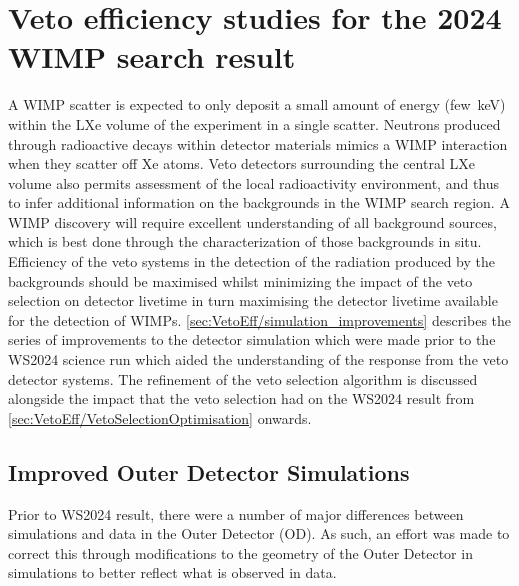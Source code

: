 \chapter{Veto efficiency studies for the 2024 WIMP search result}\label{chap:VetoEfficiency}
A WIMP scatter is expected to only deposit a small amount of energy (few~keV) within the LXe volume of the experiment in a single scatter. Neutrons produced through radioactive decays within detector materials mimics a WIMP interaction when they scatter off Xe atoms. Veto detectors surrounding the central LXe volume also permits assessment of the local radioactivity environment, and thus to infer additional information on the backgrounds in the WIMP search region. A WIMP discovery will require excellent understanding of all background sources, which is best done through the characterization of those backgrounds in situ. Efficiency of the veto systems in the detection of the radiation produced by the backgrounds should be maximised whilst minimizing the impact of the veto selection on detector livetime in turn maximising the detector livetime available for the detection of WIMPs. \autoref{sec:VetoEff/simulation_improvements} describes the series of improvements to the detector simulation which were made prior to the WS2024 science run which aided the understanding of the response from the veto detector systems. The refinement of the veto selection algorithm is discussed alongside the impact that the veto selection had on the WS2024 result from \autoref{sec:VetoEff/VetoSelectionOptimisation} onwards.

\section{Improved Outer Detector Simulations}\label{sec:VetoEff/simulation_improvements}
Prior to WS2024 result, there were a number of major differences between simulations and data in the Outer Detector (OD). As such, an effort was made to correct this through modifications to the geometry of the Outer Detector in simulations to better reflect what is observed in data.
